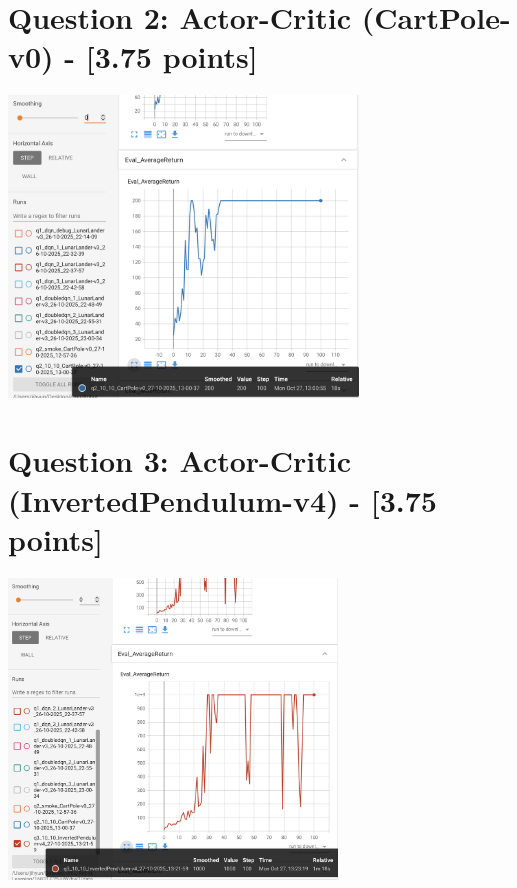 \documentclass{article}
\begin{document}
\section{Question 2: Actor-Critic (CartPole-v0) - [3.75 points]}
\begin{answer}[title=Question 2,height=9.5cm,width=\linewidth]
\centering
\includegraphics[height=8cm]{q2.png}
\end{answer}



\section{Question 3: Actor-Critic (InvertedPendulum-v4) - [3.75 points]}
\begin{answer}[title=Question 3,height=9.5cm,width=\linewidth]
\centering
\includegraphics[height=8cm]{q3.png}
\end{answer}
\end{document}
